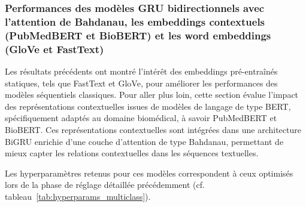 \documentclass[12pt]{report}
\begin{document}
\subsubsection{Performances des modèles GRU bidirectionnels avec l'attention de Bahdanau, les embeddings contextuels (PubMedBERT et BioBERT) et les word embeddings (GloVe et FastText)}

Les résultats précédents ont montré l’intérêt des embeddings pré-entraînés statiques, tels que FastText et GloVe, pour améliorer les performances des modèles séquentiels classiques. Pour aller plus loin, cette section évalue l’impact des représentations contextuelles issues de modèles de langage de type BERT, spécifiquement adaptés au domaine biomédical, à savoir PubMedBERT et BioBERT. Ces représentations contextuelles sont intégrées dans une architecture BiGRU enrichie d’une couche d’attention de type Bahdanau, permettant de mieux capter les relations contextuelles dans les séquences textuelles.

Les hyperparamètres retenus pour ces modèles correspondent à ceux optimisés lors de la phase de réglage détaillée précédemment (cf. tableau~\ref{tab:hyperparams_multiclass}).

\begin{table}[H]
\centering
{}
\caption{Performances des modèles BiGRU avec attention et différents types d'embeddings (statiques et contextuels) sur l’ensemble de test.}
\label{tab:performances_contextual}
\end{table}
\end{document}

